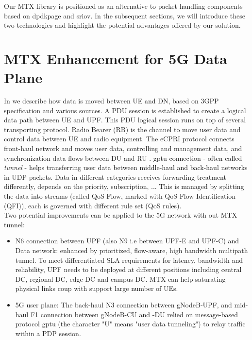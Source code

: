Our \ac{MTX} library is positioned as an alternative to packet handling components based on \ac{dpdkpage} and \ac{sriov}. 
In the subsequent sections, we will introduce these two technologies and highlight the potential advantages offered by our solution. 

\section{MTX Enhancement for 5G Data Plane}
\label{sec:related_work:5g_dataplane_enhancement}
In  we describe how data is moved between \ac{UE} and \ac{DN}, based on 3GPP specification and various sources.
A \ac{PDU} session is established to create a logical data path between \ac{UE} and \ac{UPF}.
This \ac{PDU} logical session runs on top of several transporting protocol.
Radio Bearer (RB) is the channel to move user data and control data between UE and radio equipment.
The \ac{eCPRI} protocol connects front-haul network and moves user data, controlling and management data, and synchronization data flows between DU and RU \cite{eCPRI_spec}.
\ac{gptu} connection - often called \textit{tunnel} - helps transferring user data between middle-haul and back-haul networks in UDP packets.
Data in different categories receives forwarding treatment differently, depends on the priority, subscription, ... 
This is managed by splitting the data into streams (called \ac{QoS} Flow, marked with QoS Flow Identification (QFI)), each is governed with different rule set (QoS rules).
\\

Two potential improvements can be applied to the 5G network with out MTX tunnel:
\begin{itemize}
    \item N6 connection between UPF (also N9 i.e between UPF-E and UPF-C) and Data network: enhanced by prioritized, flow-aware, high bandwidth multipath tunnel. 
	To meet differentiated SLA requirements for latency, bandwidth and reliability, UPF needs to be deployed at different positions including central DC, regional DC, edge DC and campus DC. 
	MTX can help saturating physical links coup with support large number of UEs.
    \item 5G user plane:  
	The back-haul N3 connection between gNodeB-UPF, and mid-haul F1 connection between gNodeB-CU and -DU relied on message-based protocol \ac{gptu} (the character "U" means "user data tunneling") to relay traffic within a PDP session.
\end{itemize}

